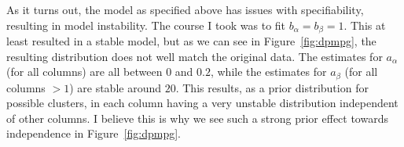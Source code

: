 As it turns out, the model as specified above has issues with specifiability, resulting in model
  instability.  The course I took was to fit $b_{\alpha} = b_{\beta} = 1$.  This at least resulted
  in a stable model, but as we can see in Figure~\ref{fig:dpmpg}, the resulting distribution does
  not well match the original data.  The estimates for $a_{\alpha}$ (for all columns) are all
  between $0$ and $0.2$, while the estimates for $a_{\beta}$ (for all columns $> 1$) are stable
  around $20$.  This results, as a prior distribution for possible clusters, in each column having
  a very unstable distribution independent of other columns.  I believe this is why we see such a
  strong prior effect towards independence in Figure~\ref{fig:dpmpg}.

